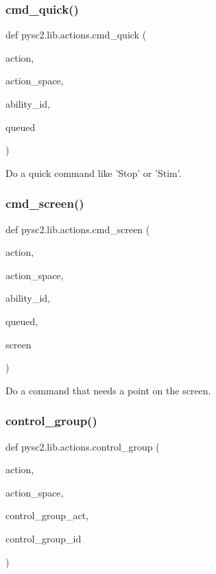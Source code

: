 \subsubsection{\texorpdfstring{cmd\+\_\+quick()}{cmd\_quick()}}
{\footnotesize\ttfamily def pysc2.\+lib.\+actions.\+cmd\+\_\+quick (\begin{DoxyParamCaption}\item[{}]{action,  }\item[{}]{action\+\_\+space,  }\item[{}]{ability\+\_\+id,  }\item[{}]{queued }\end{DoxyParamCaption})}

\begin{DoxyVerb}Do a quick command like 'Stop' or 'Stim'.\end{DoxyVerb}
 \mbox{\label{namespacepysc2_1_1lib_1_1actions_a6a71ca9bf1a3ce76be66fe022c827d4a}} 
\subsubsection{\texorpdfstring{cmd\+\_\+screen()}{cmd\_screen()}}
{\footnotesize\ttfamily def pysc2.\+lib.\+actions.\+cmd\+\_\+screen (\begin{DoxyParamCaption}\item[{}]{action,  }\item[{}]{action\+\_\+space,  }\item[{}]{ability\+\_\+id,  }\item[{}]{queued,  }\item[{}]{screen }\end{DoxyParamCaption})}

\begin{DoxyVerb}Do a command that needs a point on the screen.\end{DoxyVerb}
 \mbox{\label{namespacepysc2_1_1lib_1_1actions_a3dfc90aaa086b113d41fe641d7afb0d4}} 
\subsubsection{\texorpdfstring{control\+\_\+group()}{control\_group()}}
{\footnotesize\ttfamily def pysc2.\+lib.\+actions.\+control\+\_\+group (\begin{DoxyParamCaption}\item[{}]{action,  }\item[{}]{action\+\_\+space,  }\item[{}]{control\+\_\+group\+\_\+act,  }\item[{}]{control\+\_\+group\+\_\+id }\end{DoxyParamCaption})}

